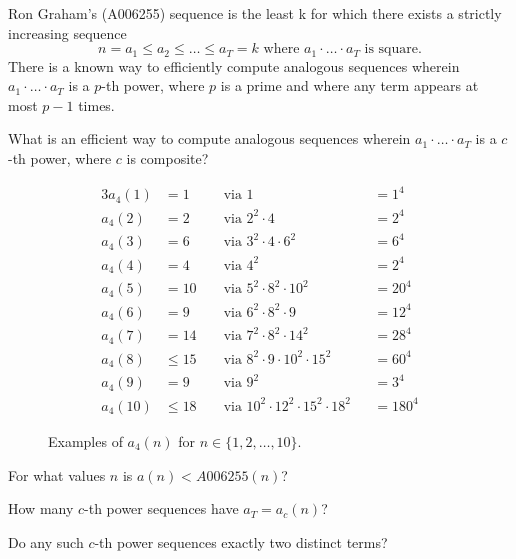 \documentclass{article}
\begin{document}
  Ron Graham's (A006255) sequence is the least k for which there exists a
  strictly increasing sequence \[
    n = a_1 \leq a_2 \leq \hdots \leq a_T = k \text{ where }
    a_1 \cdot\hdots\cdot a_T \text{ is square.}
  \]
  There is a known way to efficiently compute analogous sequences wherein
  $a_1 \cdot\hdots\cdot a_T$ is a $p$-th power, where $p$ is a prime and where
  any term appears at most $p - 1$ times.
\begin{question}
  What is an efficient way to compute analogous sequences wherein
  $a_1 \cdot\hdots\cdot a_T$ is a $c$-th power, where $c$ is composite?
\end{question}
\begin{figure}[!h]
  \centering
  \begin{alignat*}{3}
  a_4(1) &= 1      &&\text{ via } 1                                     &&= 1^4\\
  a_4(2) &= 2      &&\text{ via } 2^2 \cdot 4                           &&= 2^4\\
  a_4(3) &= 6      &&\text{ via } 3^2 \cdot 4 \cdot 6^2                 &&= 6^4\\
  a_4(4) &= 4      &&\text{ via } 4^2                                   &&= 2^4\\
  a_4(5) &= 10     &&\text{ via } 5^2 \cdot 8^2 \cdot 10^2              &&= 20^4\\
  a_4(6) &= 9      &&\text{ via } 6^2 \cdot 8^2 \cdot 9                 &&= 12^4\\
  a_4(7) &= 14     &&\text{ via } 7^2 \cdot 8^2 \cdot 14^2              &&= 28^4\\
  a_4(8) &\leq 15  &&\text{ via } 8^2 \cdot 9 \cdot 10^2 \cdot 15^2     &&= 60^4\\
  a_4(9) &= 9      &&\text{ via } 9^2                                   &&= 3^4\\
  a_4(10) &\leq 18 &&\text{ via } 10^2 \cdot 12^2 \cdot 15^2 \cdot 18^2 &&= 180^4
  \end{alignat*}
  \caption{
    Examples of $a_4(n)$ for $n \in \{1, 2,\hdots,10\}$.
  }
\end{figure}

\begin{related}
  \item For what values $n$ is $a(n) < A006255(n)$?
  \item How many $c$-th power sequences have $a_T = a_c(n)$?
  \item Do any such $c$-th power sequences exactly two distinct terms?
\end{related}
\end{document}
